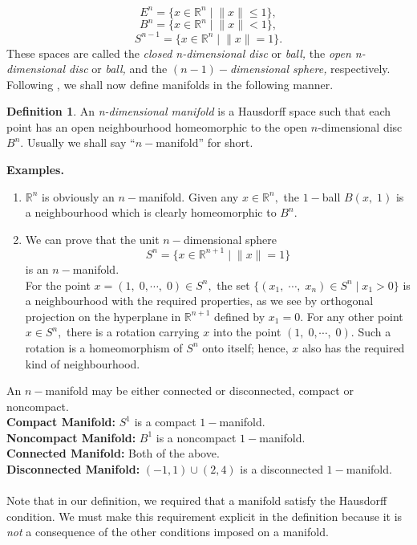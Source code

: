 \documentclass{article}
\theoremstyle{definition}
\newtheorem{defn}[theorem]{Definition}
\begin{document}
\[E^n = \{x \in \mathbb{R}^n\;|\;\|x\| \le 1\},\]
\[B^n = \{x \in \mathbb{R}^n\;|\;\|x\| < 1\},\]
\[S^{n-1} = \{x \in \mathbb{R}^n\;|\;\|x\| = 1\}.\]
These spaces are called the \emph{closed n-dimensional disc} or \emph{ball,} the \emph{open n-dimensional disc} or \emph{ball,} and the $(n - 1)-$\emph{dimensional sphere,} respectively.\\
%
Following \cite{book:mass}, we shall now define manifolds in the following manner.
\begin{defn}
  An \emph{n-dimensional manifold} is a Hausdorff space such that each point has an open neighbourhood homeomorphic to the open $n$-dimensional disc $B^n.$ Usually we shall say ``$n-$manifold'' for short.
\end{defn}
\textbf{Examples.}\\
\begin{enumerate}[nosep] 
  \item $\mathbb{R}^n$ is obviously an $n-$manifold. Given any $x \in \mathbb{R}^n,$ the $1-$ball $B(x,\;1)$ is a neighbourhood which is clearly homeomorphic to $B^n.$
  \item We can prove that the unit $n-$dimensional sphere
  \[S^n = \{x \in \mathbb{R}^{n+1}\;|\;\|x\| = 1\}\]
  is an $n-$manifold.\\
  For the point $x = (1,\;0,\cdots,\;0)\in S^n,$ the set $\{(x_1,\;\cdots,\;x_n) \in S^n\;|\;x_1>0\}$ is a neighbourhood with the required properties, as we see by orthogonal projection on the hyperplane in $\mathbb{R}^{n+1}$ defined by $x_1 = 0.$ For any other point $x\in S^n,$ there is a rotation carrying $x$ into the point $(1,\;0,\cdots,\;0).$ Such a rotation is a homeomorphism of $S^n$ onto itself; hence, $x$ also has the required kind of neighbourhood.
\end{enumerate}
An $n-$manifold may be either connected or disconnected, compact or noncompact.\\
\textbf{Compact Manifold:} $S^1$ is a compact $1-$manifold.\\
\textbf{Noncompact Manifold:} $B^1$ is a noncompact $1-$manifold.\\
\textbf{Connected Manifold:} Both of the above.\\
\textbf{Disconnected Manifold:} $(-1, 1)\cup(2, 4)$ is a disconnected $1-$manifold.\\\\
Note that in our definition, we required that a manifold satisfy the Hausdorff condition. We must make this requirement explicit in the definition because it is \emph{not} a consequence of the other conditions imposed on a manifold.
\end{document}
